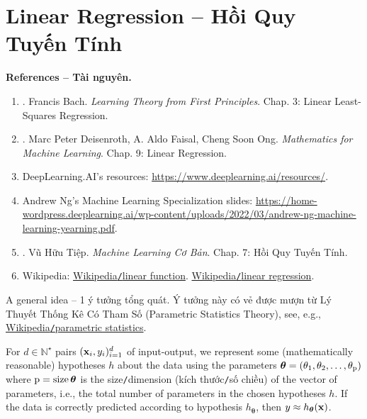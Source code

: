 \documentclass{article}
\begin{document}

\section{Linear Regression -- Hồi Quy Tuyến Tính}
\textbf{\textsf{References -- Tài nguyên.}}
\begin{enumerate}
	\item \cite{Bach2024}. {\sc Francis Bach}. {\it Learning Theory from First Principles}. Chap. 3: Linear Least-Squares Regression.
	\item \cite{Deisenroth_Faisal_Ong2024}. {\sc Marc Peter Deisenroth, A. Aldo Faisal, Cheng Soon Ong}. {\it Mathematics for Machine Learning}. Chap. 9: Linear Regression.
	\item DeepLearning.AI's resources: \url{https://www.deeplearning.ai/resources/}.
	\item {\sc Andrew Ng}'s Machine Learning Specialization slides: \url{https://home-wordpress.deeplearning.ai/wp-content/uploads/2022/03/andrew-ng-machine-learning-yearning.pdf}.
	\item \cite{Tiep_ML_co_ban}. {\sc Vũ Hữu Tiệp}. {\it Machine Learning Cơ Bản}. Chap. 7: Hồi Quy Tuyến Tính.
	\item Wikipedia: \href{https://en.wikipedia.org/wiki/Linear_function}{Wikipedia{\tt/}linear function}. \href{https://en.wikipedia.org/wiki/Linear_regression}{Wikipedia{\tt/}linear regression}.
\end{enumerate}
{\sf A general idea -- 1 ý tưởng tổng quát.} Ý tưởng này có vẻ được mượn từ Lý Thuyết Thống Kê Có Tham Số (Parametric Statistics Theory), see, e.g., \href{https://en.wikipedia.org/wiki/Parametric_statistics}{Wikipedia{\tt/}parametric statistics}.

For $d\in\mathbb{N}^\star$ pairs $({\bf x}_i,y_i)_{i=1}^d$ of input-output, we represent some (mathematically reasonable) hypotheses $h$ about the data using the parameters $\boldsymbol{\theta} = (\theta_1,\theta_2,\ldots,\theta_{\rm p})$ where ${\rm p} = \operatorname{size}\boldsymbol{\theta}$ is the size{\tt/}dimension (kích thước{\tt/}số chiều) of the vector of parameters, i.e., the total number of parameters in the chosen hypotheses $h$. If the data is correctly predicted according to hypothesis $h_{\boldsymbol{\theta}}$, then $y\approx h_{\boldsymbol{\theta}}({\bf x})$.
\end{document}
